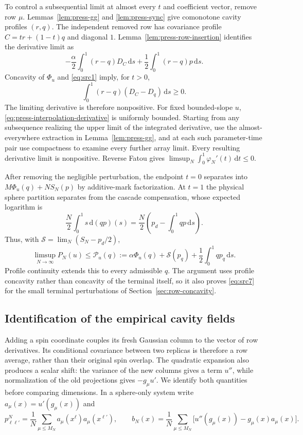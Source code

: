 \documentclass[11pt,a4paper]{article}
\numberwithin{equation}{section}
\theoremstyle{definition}
\theoremstyle{remark}
\newcommand{\dd}{\mathrm d}
\begin{document}
To control a subsequential limit at almost every $t$ and coefficient vector,
remove row $\mu$. Lemmas~\ref{lem:press-gg} and \ref{lem:press-sync} give
comonotone cavity profiles $(r,q)$. The independent removed row has covariance
profile $C=tr+(1-t)q$ and diagonal $1$. Lemma~\ref{lem:press-row-insertion}
identifies the derivative limit as
\[
 -\frac\alpha2\int_0^1(r-q)D_C\,\dd s
 +\frac12\int_0^1(r-q)p\,\dd s.
\]
Concavity of $\Phi_u$ and \eqref{eq:src1} imply, for $t>0$,
\[
 \int_0^1(r-q)(D_C-D_q)\,\dd s\ge0.
\]
The limiting derivative is therefore nonpositive. For fixed bounded-slope
$u$, \eqref{eq:press-interpolation-derivative} is uniformly bounded. Starting
from any subsequence realizing the upper limit of the integrated derivative,
use the almost-everywhere extraction in Lemma~\ref{lem:press-gg}, and at each
such parameter-time pair use compactness to examine every further array
limit. Every resulting derivative limit is nonpositive. Reverse Fatou gives
$\limsup_N\int_0^1\varphi_N'(t)\,\dd t\le0$.

After removing the negligible perturbation, the endpoint $t=0$ separates into
$M\Phi_u(q)+NS_N(p)$ by additive-mark factorization. At $t=1$ the physical
sphere partition separates from the cascade compensation, whose expected
logarithm is
\[
 \frac N2\int_0^1s\,\dd(qp)(s)
 =\frac N2\left(p_d-\int_0^1qp\,\dd s\right).
\]
Thus, with $\mathcal S=\lim_N(S_N-p_d/2)$,
\begin{equation}\label{eq:src7}
 \limsup_{N\to\infty}P_N(u)
 \le\mathcal P_u(q)
 :=\alpha\Phi_u(q)+\mathcal S(p_q)
       +\frac12\int_0^1q p_q\,\dd s.
\end{equation}
Profile continuity extends this to every admissible $q$. The argument uses
profile concavity rather than concavity of the terminal itself, so it also
proves \eqref{eq:src7} for the small terminal perturbations of
Section~\ref{sec:row-concavity}.

\subsection{Identification of the empirical cavity fields}

Adding a spin coordinate couples its fresh Gaussian column to the vector
of row derivatives. Its conditional covariance between two replicas is
therefore a row average, rather than their original spin overlap.
The quadratic expansion also produces a scalar shift: the variance of
the new columns gives a term $u''$, while normalization of the old
projections gives $-g_\mu u'$. We identify both quantities before
comparing dimensions. In a sphere-only system write
$a_\mu(x)=u'(g_\mu(x))$ and
\[
 p^N_{\ell\ell'}=\frac1N\sum_{\mu\le M_N}
                    a_\mu(x^\ell)a_\mu(x^{\ell'}),\qquad
 b_N(x)=\frac1N\sum_{\mu\le M_N}
          \big[u''(g_\mu(x))-g_\mu(x)a_\mu(x)\big].
\]
\end{document}
